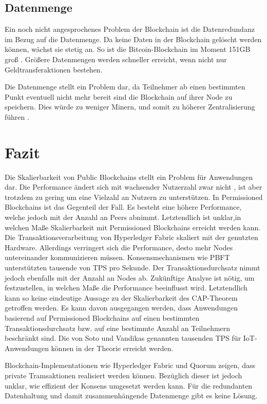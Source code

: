\subsection{Datenmenge}
Ein noch nicht angesprochenes Problem der Blockchain ist die Datenredundanz im Bezug auf die Datenmenge. Da keine Daten in der Blockchain gelöscht werden können, wächst sie stetig an. So ist die Bitcoin-Blockchain im Moment 151GB groß \cite{BlockchainUnternehmenBlockchainSizeBitcoin}. Größere Datenmengen werden schneller erreicht, wenn nicht nur Geldtransferaktionen bestehen.

Die Datenmenge stellt ein Problem dar, da Teilnehmer ab einen bestimmten Punkt eventuell nicht mehr bereit sind die Blockchain auf ihrer Node zu speichern. Dies würde zu weniger Minern, und somit zu höherer Zentralisierung führen \cite{SchererPerformanceScalabilityBlockchain2017}.

\section{Fazit}
Die Skalierbarkeit von Public Blockchains stellt ein Problem für Anwendungen dar. Die Performance ändert sich mit wachsender Nutzerzahl zwar nicht \cite{SchererPerformanceScalabilityBlockchain2017}, ist aber trotzdem zu gering um eine Vielzahl an Nutzern zu unterstützen. In Permissioned Blockchains ist das Gegenteil der Fall. Es besteht eine höhere Performance, welche jedoch mit der Anzahl an Peers abnimmt. Letztendlich ist unklar,in welchen Maße Skalierbarkeit mit Permissioned Blockchains erreicht werden kann. Die Transaktionsverarbeitung von Hyperledger Fabric skaliert mit der genutzten Hardware. Allerdings verringert sich die Performance, desto mehr Nodes untereinander kommunizieren müssen. Konsensmechanismen wie \acs{PBFT} unterstützten tausende von TPS pro Sekunde. Der Transaktionsdurchsatz nimmt jedoch ebenfalls mit der Anzahl an Nodes ab. Zukünftige Analyse ist nötig, um festzustellen, in welchen Maße die Performance beeinflusst wird. Letztendlich kann so keine eindeutige Aussage zu der Skalierbarkeit des CAP-Theorem getroffen werden. Es kann davon ausgegangen werden, dass Anwendungen basierend auf Permissioned Blockchains auf einen bestimmten Transaktionsdurchsatz bzw. auf eine bestimmte Anzahl an Teilnehmern beschränkt sind. Die von Soto und Vandikas genannten tausenden TPS für IoT-Anwendungen können in der Theorie erreicht werden. 

Blockchain-Implementationen wie Hyperledger Fabric und Quorum zeigen, dass private Tramsaktionen realisiert werden können. Bezüglich dieser ist jedoch unklar, wie effizient der Konsens umgesetzt werden kann. Für die redundanten Datenhaltung und damit zusammenhängende Datenmenge gibt es keine Lösung.





